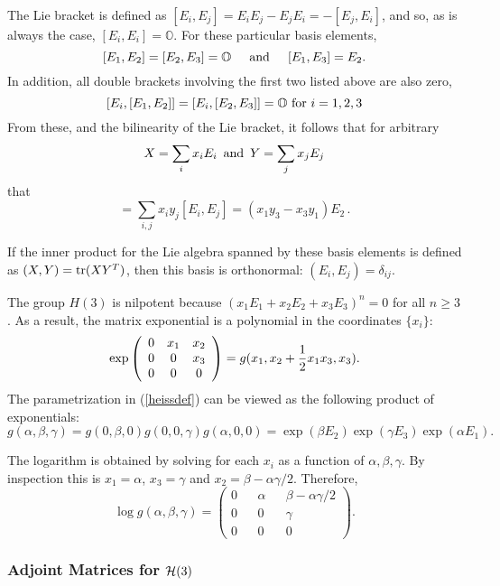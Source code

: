 \documentclass{svmult}
\def\half{ {1\over 2} }
\def\htab{ {\hskip 0.1 true in} }
\newcommand{\OO}{\mathbb{O}}
\newcommand{\ba}{\left(\begin{array}}
\newcommand{\ea}{\end{array}\right)}
\newcommand{\beq}{ \begin{equation}}
\newcommand{\eeq}{ \end{equation} }
\begin{document}
The Lie bracket is defined as $[E_i,E_j] = E_i E_j - E_j E_i = -[E_j,E_i] $,
and so, as is always the case, $[E_i,E_i] = \OO$.
For these particular basis elements,
$$ [E_1,E_2] = [E_2,E_3]= \OO \htab\htab {\rm and} \htab\htab [E_1,E_3]=E_2. $$
In addition, all double brackets involving the first two listed above are also zero,
$$ [E_i,[E_1,E_2]] = [E_i,[E_2,E_3]] = \OO \,\,{\rm for}\,\, i=1,2,3 $$
From these, and the bilinearity of the Lie bracket, it follows that for arbitrary
$$ X = \sum_i x_i E_i \,\,\,{\rm and}\,\,\,  Y = \sum_j x_j E_j $$
that
\begin{equation}
 [X,Y] = \sum_{i,j} x_i y_j [E_i,E_j] = (x_1 y_3 - x_3 y_1) E_2\,.
\label{bracketeq}
\end{equation}

If the inner product for the Lie algebra spanned by these basis
elements is defined as $(X,Y) = {\rm tr}(X Y^T)$, then this basis
is orthonormal: $(E_i,E_j) = \delta_{ij}$.

The group $H(3)$ is nilpotent because $(x_1 E_1 + x_2 E_2 + x_3 E_3)^{n} = 0$
for all $n \geq 3$. As a result, the matrix exponential is a polynomial in
the coordinates $\{x_i\}$:
\beq
\exp \ba{ccc}
0 & x_1 & x_2 \\
0 & 0 & x_3 \\
0 & 0 & 0
\ea = g(x_1, x_2 + \half{x_1 x_3}, x_3).
\label{expparheis}
\eeq
The parametrization in (\ref{heissdef}) can be viewed as the
following product of exponentials:
$$ g(\alpha, \beta, \gamma) = g(0, \beta, 0) g(0,0, \gamma) g(\alpha, 0,0) = \exp(\beta E_2) \exp(\gamma E_3) \exp(\alpha E_1). $$

The logarithm is obtained by solving for each $x_i$ as a function
of $\alpha, \beta, \gamma$. By inspection this is
$x_1 = \alpha$, $x_3 = \gamma$ and $x_2 = \beta - \alpha\gamma/2$.
Therefore,
$$ \log g(\alpha, \beta, \gamma) = \ba{ccccc}
0 & & \alpha & & \beta - \alpha\gamma/2 \\
0 & & 0 & & \gamma \\
0 & & 0 & & 0
\ea . $$

\subsubsection{Adjoint Matrices for ${\cal H}(3)$}
\end{document}
